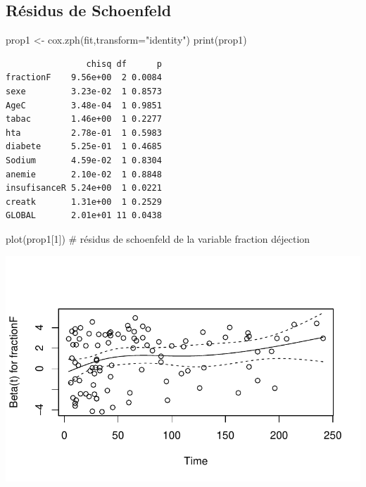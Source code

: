 \documentclass[
  letterpaper,
  DIV=11,
  numbers=noendperiod]{scrartcl}
\newenvironment{Shaded}{\begin{snugshade}}{\end{snugshade}}
\newcommand{\AttributeTok}[1]{\textcolor[rgb]{0.40,0.45,0.13}{#1}}
\newcommand{\CommentTok}[1]{\textcolor[rgb]{0.37,0.37,0.37}{#1}}
\newcommand{\DecValTok}[1]{\textcolor[rgb]{0.68,0.00,0.00}{#1}}
\newcommand{\FunctionTok}[1]{\textcolor[rgb]{0.28,0.35,0.67}{#1}}
\newcommand{\NormalTok}[1]{\textcolor[rgb]{0.00,0.23,0.31}{#1}}
\newcommand{\OtherTok}[1]{\textcolor[rgb]{0.00,0.23,0.31}{#1}}
\newcommand{\StringTok}[1]{\textcolor[rgb]{0.13,0.47,0.30}{#1}}
\begin{document}
\subsection{Résidus de Schoenfeld}\label{ruxe9sidus-de-schoenfeld}

\begin{Shaded}
\begin{Highlighting}[]
\NormalTok{prop1 }\OtherTok{\textless{}{-}} \FunctionTok{cox.zph}\NormalTok{(fit,}\AttributeTok{transform=}\StringTok{"identity"}\NormalTok{)}
\FunctionTok{print}\NormalTok{(prop1)}
\end{Highlighting}
\end{Shaded}

\begin{verbatim}
                chisq df      p
fractionF    9.56e+00  2 0.0084
sexe         3.23e-02  1 0.8573
AgeC         3.48e-04  1 0.9851
tabac        1.46e+00  1 0.2277
hta          2.78e-01  1 0.5983
diabete      5.25e-01  1 0.4685
Sodium       4.59e-02  1 0.8304
anemie       2.10e-02  1 0.8848
insufisanceR 5.24e+00  1 0.0221
creatk       1.31e+00  1 0.2529
GLOBAL       2.01e+01 11 0.0438
\end{verbatim}

\begin{Shaded}
\begin{Highlighting}[]
\FunctionTok{plot}\NormalTok{(prop1[}\DecValTok{1}\NormalTok{]) }\CommentTok{\# résidus de schoenfeld de la variable fraction d\textquotesingle{}éjection}
\end{Highlighting}
\end{Shaded}

\includegraphics{Rapport-technique_files/figure-pdf/unnamed-chunk-5-1.pdf}
\end{document}
